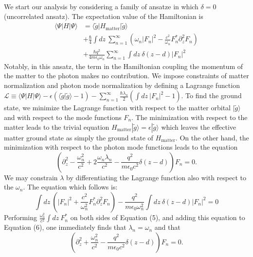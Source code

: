 \documentclass[aps,prb,twocolumn,
	groupedaddress,superscriptaddress,
	amsfonts,amssymb,amsmath,floatfix,
	citeautoscript]{revtex4-1}
\begin{document}
We start our analysis by considering a family of ansatze in which $\delta = 0$ (uncorrelated ansatz).  The expectation value of the Hamiltonian is 
\begin{align}
\langle \Psi | H | \Psi \rangle &= \langle \tilde{g} |H_{\text{matter}} | \tilde{g}\rangle \nonumber \\ &+ \frac{\hbar}{4}\int dz ~\sum\limits_{n=1}^{\infty}\left(\omega_n|F_n|^2 - \frac{c^2}{\omega_n}F_n^*\partial_z^2F_n\right) \nonumber \\ &+ \frac{\hbar q^2}{4m\epsilon_0\omega_n}\sum\limits_{n=1}^{\infty} \int dz~\delta(z-d)|F_n|^2
\end{align}
Notably, in this ansatz, the term in the Hamiltonian coupling the momentum of the matter to the photon makes no contribution. We impose constraints of matter normalization and photon mode normalization by defining a Lagrange function $\mathcal{L} \equiv \langle \Psi | H | \Psi \rangle - \epsilon(\langle \tilde{g}|\tilde{g}\rangle-1)-\sum\limits_{n=1}^{\infty}\frac{\hbar\lambda_n}{2}\left( \int dz~|F_n|^2-1\right)$. To find the ground state, we minimize the Lagrange function with respect to the matter orbital $|\tilde{g}\rangle$ and with respect to the mode functions $F_n$. The minimization with respect to the matter leads to the trivial equation $H_{\text{matter}} |\tilde{g}\rangle = \epsilon|\tilde{g}\rangle$ which leaves the effective matter ground state as simply the ground state of $H_{\text{matter}}$. On the other hand, the minimization with respect to the photon mode functions leads to  the equation
\begin{equation}
\left(\partial_z^2-\frac{\omega^2_n}{c^2}+2\frac{\omega_n\lambda_n}{c^2}-\frac{q^2 }{m\epsilon_0 c^2}\delta(z-d)\right)F_n  = 0.
\end{equation}
We may constrain $\lambda$ by differentiating the Lagrange function also with respect to the $\omega_n$. The equation which follows is:
\begin{equation}
\int dz ~\left(|F_n|^2 + \frac{c^2}{\omega^2_n}F_n^*\partial_z^2F_n\right) - \frac{ q^2}{m\epsilon_0\omega^2_n} \int dz~\delta(z-d)|F_n|^2 = 0
\end{equation}
Performing $\frac{\omega_n^2}{c^2}\int dz~F_n^*$ on both sides of Equation (5), and adding this equation to Equation (6), one immediately finds that $\lambda_n = \omega_n$ and that
\begin{equation}
\left(\partial_z^2+\frac{\omega^2_n}{c^2}-\frac{q^2 }{m\epsilon_0 c^2}\delta(z-d)\right)F_n  = 0.
\end{equation}
\end{document}
